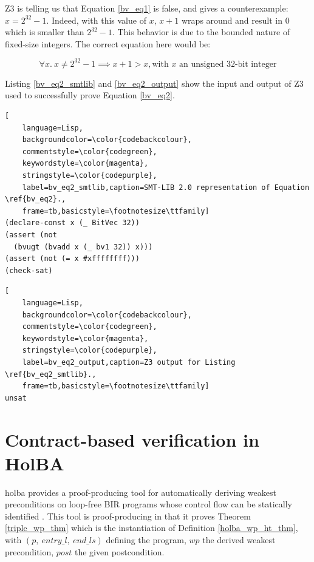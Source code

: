\documentclass{kththesis}
\begin{document}
{Z3 is telling us that Equation \ref{bv_eq1} is false, and gives a counterexample: $x=2^{32}-1$. Indeed, with this value of $x$, $x+1$ wraps around and result in $0$ which is smaller than $2^{32}-1$. This behavior is due to the bounded nature of fixed-size integers. The correct equation here would be:

\begin{equation}
    \forall x.~ x \neq 2^{32}-1 \implies x+1>x, \text{with $x$ an unsigned 32-bit integer}
    \label{bv_eq2}
\end{equation}

Listing \ref{bv_eq2_smtlib} and \ref{bv_eq2_output} show the input and output of Z3 used to successfully prove Equation \ref{bv_eq2}.

\begin{lstlisting}[
    language=Lisp,
    backgroundcolor=\color{codebackcolour},
    commentstyle=\color{codegreen},
    keywordstyle=\color{magenta},
    stringstyle=\color{codepurple},
    label=bv_eq2_smtlib,caption=SMT-LIB 2.0 representation of Equation \ref{bv_eq2}.,
    frame=tb,basicstyle=\footnotesize\ttfamily]
(declare-const x (_ BitVec 32))
(assert (not
  (bvugt (bvadd x (_ bv1 32)) x)))
(assert (not (= x #xffffffff)))
(check-sat)
\end{lstlisting}

\begin{lstlisting}[
    language=Lisp,
    backgroundcolor=\color{codebackcolour},
    commentstyle=\color{codegreen},
    keywordstyle=\color{magenta},
    stringstyle=\color{codepurple},
    label=bv_eq2_output,caption=Z3 output for Listing \ref{bv_eq2_smtlib}.,
    frame=tb,basicstyle=\footnotesize\ttfamily]
unsat
\end{lstlisting}

\section{Contract-based verification in HolBA} \label{contract-verif-holba}

\gls{holba} provides a \gls{proof-producing} tool for automatically deriving weakest preconditions on loop-free \gls{BIR} programs whose control flow can be statically identified \cite{lindner_trabin:_2019}. This tool is proof-producing in that it proves Theorem \ref{triple_wp_thm} which is the instantiation of Definition \ref{holba_wp_ht_thm}, with $(p,~entry\_l,~end\_ls)$ defining the program, $wp$ the derived weakest precondition, $post$ the given postcondition.

}
\end{document}
